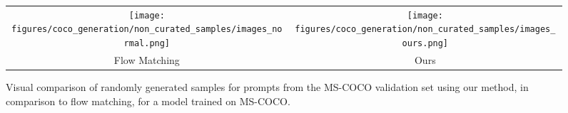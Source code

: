 \begin{figure*}[]
\centering



\begin{tabular}{c@{}c@{}}



\texttt{[image: figures/coco\_generation/non\_curated\_samples/images\_normal.png]}  & 
\texttt{[image: figures/coco\_generation/non\_curated\_samples/images\_ours.png]}  \\
Flow Matching & Ours 

\end{tabular}
\caption{Visual comparison of randomly generated samples for prompts from the MS-COCO validation set using our method, in comparison to flow matching, for a model trained on MS-COCO. } %

\label{fig:non_curated_coco}
\end{figure*}
